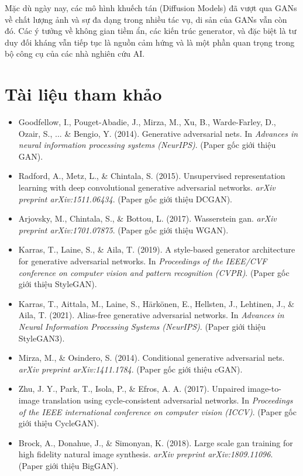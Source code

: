 Mặc dù ngày nay, các mô hình khuếch tán (Diffusion Models) đã vượt qua GANs về chất lượng ảnh và sự đa dạng trong nhiều tác vụ, di sản của GANs vẫn còn đó. Các ý tưởng về không gian tiềm ẩn, các kiến trúc generator, và đặc biệt là tư duy đối kháng vẫn tiếp tục là nguồn cảm hứng và là một phần quan trọng trong bộ công cụ của các nhà nghiên cứu AI.

\section*{Tài liệu tham khảo}
\begin{itemize}
	\item[1] Goodfellow, I., Pouget-Abadie, J., Mirza, M., Xu, B., Warde-Farley, D., Ozair, S., ... \& Bengio, Y. (2014). Generative adversarial nets. In \textit{Advances in neural information processing systems (NeurIPS)}. (Paper gốc giới thiệu GAN).
	\item[2] Radford, A., Metz, L., \& Chintala, S. (2015). Unsupervised representation learning with deep convolutional generative adversarial networks. \textit{arXiv preprint arXiv:1511.06434}. (Paper gốc giới thiệu DCGAN).
	\item[3] Arjovsky, M., Chintala, S., \& Bottou, L. (2017). Wasserstein gan. \textit{arXiv preprint arXiv:1701.07875}. (Paper gốc giới thiệu WGAN).
	\item[4] Karras, T., Laine, S., \& Aila, T. (2019). A style-based generator architecture for generative adversarial networks. In \textit{Proceedings of the IEEE/CVF conference on computer vision and pattern recognition (CVPR)}. (Paper gốc giới thiệu StyleGAN).
	\item[5] Karras, T., Aittala, M., Laine, S., Härkönen, E., Hellsten, J., Lehtinen, J., \& Aila, T. (2021). Alias-free generative adversarial networks. In \textit{Advances in Neural Information Processing Systems (NeurIPS)}. (Paper giới thiệu StyleGAN3).
	\item[6] Mirza, M., \& Osindero, S. (2014). Conditional generative adversarial nets. \textit{arXiv preprint arXiv:1411.1784}. (Paper gốc giới thiệu cGAN).
	\item[7] Zhu, J. Y., Park, T., Isola, P., \& Efros, A. A. (2017). Unpaired image-to-image translation using cycle-consistent adversarial networks. In \textit{Proceedings of the IEEE international conference on computer vision (ICCV)}. (Paper gốc giới thiệu CycleGAN).
	\item[8] Brock, A., Donahue, J., \& Simonyan, K. (2018). Large scale gan training for high fidelity natural image synthesis. \textit{arXiv preprint arXiv:1809.11096}. (Paper giới thiệu BigGAN).
\end{itemize}
